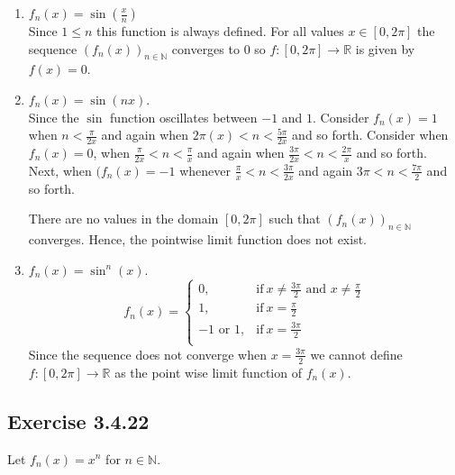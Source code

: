 \documentclass{tufte-book}
\theoremstyle{mytheoremstyle}
\theoremstyle{mylemstyle}
\theoremstyle{mydefstyle}
\begin{document}
\begin{enumerate}

\item $f_n(x) = \sin(\frac{x}{n})$\\
Since $1 \leq n$ this function is always defined.  For all values $x \in [0,2\pi]$ the sequence $(f_n(x))_{n \in \mathbb{N}}$ converges to $0$ so $f:[0,2\pi] \rightarrow \mathbb{R}$ is given by $f(x) = 0$.

\item $f_n(x) = \sin(nx)$.\\
Since the $\sin$ function oscillates between $-1$ and $1$.  Consider $f_n(x) = 1$ when $n < \frac{\pi}{2x}$ and again when $2\pi(x) < n < \frac{5\pi}{2x}$ and so forth. Consider when $f_n(x) = 0$,  when $\frac{\pi}{2x}<n<\frac{\pi}{x}$ and again  when $\frac{3\pi}{2x} < n < \frac{2\pi}{x}$ and so forth.  Next, when $(f_n(x) = -1$ whenever $\frac{\pi}{x}<n<\frac{3\pi}{2x}$ and again $3\pi < n < \frac{7\pi}{2}$ and so forth.

There are no values in the domain $[0, 2\pi]$ such that $(f_n(x))_{n \in \mathbb{N}}$ converges.  Hence, the pointwise limit function does not exist.

\item $f_n(x) = \sin^n(x)$.
\[f_n(x) = 
\begin{cases}
      0, & \text{if}\ x \neq \frac{3\pi}{2} \text{ and } x\neq \frac{\pi}{2} \\
      1, & \text{if}\ x = \frac{\pi}{2}\\
      -1 \text{ or } 1, & \text{if}\ x = \frac{3\pi}{2}\\
\end{cases}
\]
Since the sequence does not converge when $x = \frac{3\pi}{2}$ we cannot define $f: [0,2\pi] \rightarrow \mathbb{R}$ as the point wise limit function of $f_n(x)$.

\end{enumerate}

\subsection{Exercise 3.4.22}
Let $f_n(x) = x^n$ for $n \in \mathbb{N}$.
\end{document}
